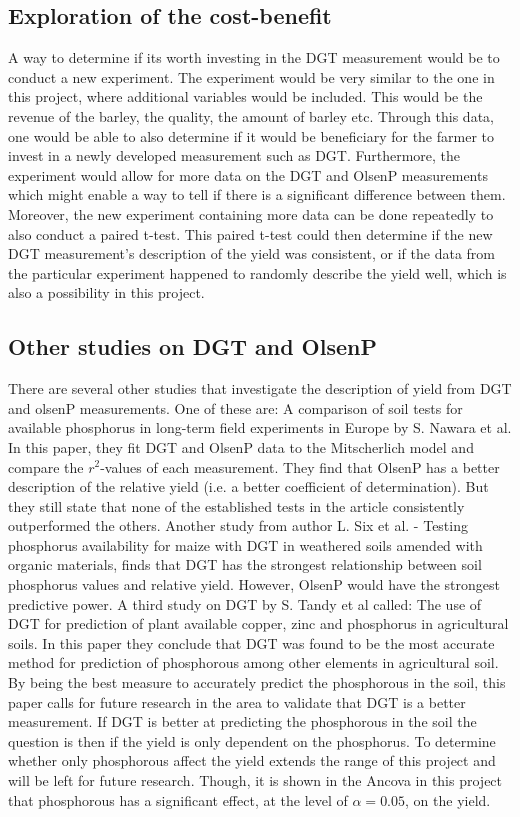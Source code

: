 \documentclass[11pt, fleqn, titlepage]{article}
\begin{document}
\subsection*{Exploration of the cost-benefit }
A way to determine if its worth investing in the DGT measurement would be to conduct a new experiment. The experiment would be very similar to the one in this project, where additional variables would be included. This would be the revenue of the barley, the quality, the amount of barley etc. Through this data, one would be able to also determine if it would be beneficiary for the farmer to invest in a newly developed measurement such as DGT. Furthermore, the experiment would allow for more data on the DGT and OlsenP measurements which might enable a way to tell if there is a significant difference between them. Moreover, the new experiment containing more data can be done repeatedly to also conduct a paired t-test. This paired t-test could then determine if the new DGT measurement's description of the yield was consistent, or if the data from the particular experiment happened to randomly describe the yield well, which is also a possibility in this project. 

\subsection*{Other studies on DGT and OlsenP}
There are several other studies that investigate the description of yield from DGT and olsenP measurements. One of these are: A comparison of soil tests for available phosphorus in  long-term field experiments in Europe by S. Nawara et al. In this paper, they fit DGT and OlsenP data to the Mitscherlich model and compare the $ r^2 $-values of each measurement. They find that OlsenP has a better description of the relative yield (i.e. a better coefficient of determination). But they still state that none of the established tests in the article consistently outperformed the others.  \cite{article1} Another study from author L. Six et al. - Testing phosphorus availability for maize with DGT in weathered soils amended with organic materials, finds that DGT has the strongest relationship between soil phosphorus values and relative yield. However, OlsenP would have the strongest predictive power. \cite{article2} A third study on DGT by S. Tandy et al called: The use of DGT for prediction of plant available copper, zinc and phosphorus in agricultural soils. In this paper they conclude that DGT was found to be the most accurate method for prediction of phosphorous among  other elements in agricultural soil. By being the best measure to accurately predict the phosphorous in the soil, this paper calls for future research in the area to validate that DGT is a better measurement. \cite{article3} If DGT is better at predicting the phosphorous in the soil the question is then if the yield is only dependent on the phosphorus. To determine whether only phosphorous affect the yield extends the range of this project and will be left for future research. Though, it is shown in the Ancova in this project that phosphorous has a significant effect, at the level of $ \alpha=0.05 $, on the yield. 
\end{document}
